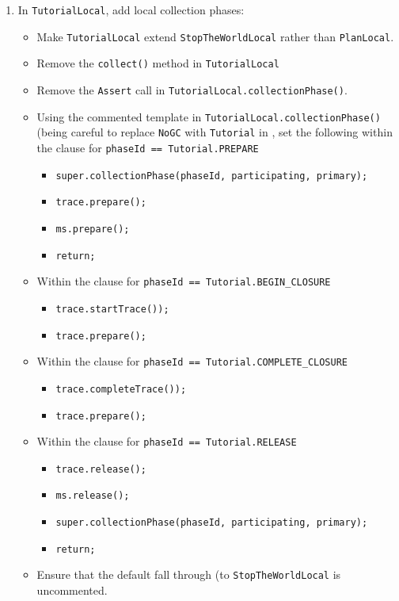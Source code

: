 \documentclass[textsize=14pt]{article}
\newcommand{\code}[1]{\texttt{#1}}
\begin{document}
\begin{itemize}
\begin{enumerate}
\begin{enumerate}
        \item In \code{TutorialLocal}, add local collection phases:
        \begin{itemize}
            \item Make \code{TutorialLocal} extend \code{StopTheWorldLocal} rather than \code{PlanLocal}.
            \item Remove the \code{collect()} method in
            \code{TutorialLocal}
            \item Remove the \code{Assert} call in
            \code{TutorialLocal.collectionPhase()}.
            \item Using the commented template in \code{TutorialLocal.collectionPhase()} (being careful to replace \code{NoGC} with \code{Tutorial} in
            , set the following within the clause for
            \code{phaseId == Tutorial.PREPARE}
            \begin{itemize}
                \item[] \code{super.collectionPhase(phaseId, participating, primary);}
                \item[] \code{trace.prepare();}
                \item[] \code{ms.prepare();}
                \item[] \code{return;}
            \end{itemize}
            \item Within the clause for \code{phaseId == Tutorial.BEGIN\_CLOSURE}
            \begin{itemize}
                \item[] \code{trace.startTrace());}
                \item[] \code{trace.prepare();}
            \end{itemize}
            \item Within the clause for \code{phaseId == Tutorial.COMPLETE\_CLOSURE}
            \begin{itemize}
                \item[] \code{trace.completeTrace());}
                \item[] \code{trace.prepare();}
            \end{itemize}
            \item Within the clause for \code{phaseId == Tutorial.RELEASE}
            \begin{itemize}
                \item[] \code{trace.release();}
                \item[] \code{ms.release();}
                \item[] \code{super.collectionPhase(phaseId, participating, primary);}
                \item[] \code{return;}
            \end{itemize}
            \item Ensure that the default fall through (to
            \code{StopTheWorldLocal} is uncommented.
        \end{itemize}


\end{enumerate}
\end{enumerate}
\end{itemize}
\end{document}
